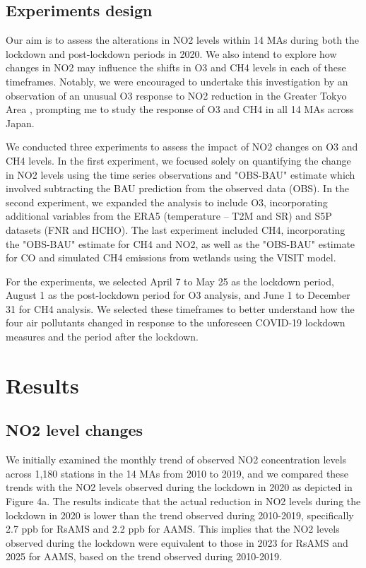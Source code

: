 \subsection{Experiments design}
Our aim is to assess the alterations in NO2 levels within 14 MAs during both the lockdown and post-lockdown periods in 2020. We also intend to explore how changes in NO2 may influence the shifts in O3 and CH4 levels in each of these timeframes. Notably, we were encouraged to undertake this investigation by an observation of an unusual O3 response to NO2 reduction in the Greater Tokyo Area \citep{damiani2022peculiar}, prompting me to study the response of O3 and CH4 in all 14 MAs across Japan. \par
We conducted three experiments to assess the impact of NO2 changes on O3 and CH4 levels. In the first experiment, we focused solely on quantifying the change in NO2 levels using the time series observations and "OBS-BAU" estimate which involved subtracting the BAU prediction from the observed data (OBS). In the second experiment, we expanded the analysis to include O3, incorporating additional variables  from the ERA5 (temperature – T2M and SR) and S5P datasets (FNR and HCHO). The last experiment included CH4, incorporating the "OBS-BAU" estimate for CH4 and NO2, as well as the "OBS-BAU" estimate for CO and simulated CH4 emissions from wetlands using the VISIT model. \par
For the experiments, we selected April 7 to May 25 as the lockdown period, August 1 as the post-lockdown period for O3 analysis, and June 1 to December 31 for CH4 analysis. We selected these timeframes to better understand how the four air pollutants changed in response to the unforeseen COVID-19 lockdown measures and the period after the lockdown. \par

\section{Results} \label{chap4_result}
\subsection{NO2 level changes}
We initially examined the monthly trend of observed NO2 concentration levels across 1,180 stations in the 14 MAs from 2010 to 2019, and we compared these trends with the NO2 levels observed during the lockdown in 2020 as depicted in Figure 4a. The results indicate that the actual reduction in NO2 levels during the lockdown in 2020 is lower than the trend observed during 2010-2019, specifically 2.7 ppb for RsAMS and 2.2 ppb for AAMS. This implies that the NO2 levels observed during the lockdown were equivalent to those in 2023 for RsAMS and 2025 for AAMS, based on the trend observed during 2010-2019. \par

